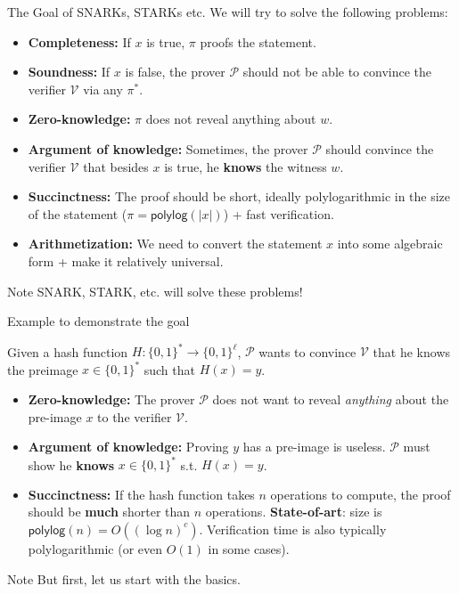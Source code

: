 \documentclass[xcolor={usenames,dvipsnames}]{beamer}
\begin{document}
    \begin{frame}{The Goal of SNARKs, STARKs etc.}
        We will try to solve the following problems:
        \begin{itemize}
            \item \textbf{Completeness:} If $x$ is true, $\pi$ proofs the statement.
            \item \textbf{Soundness:} If $x$ is false, the prover $\mathcal{P}$ should not be able to convince the verifier $\mathcal{V}$ via any $\pi^*$.
            \item \textbf{Zero-knowledge:} $\pi$ does not reveal anything about $w$.
            \item \textbf{Argument of knowledge:} Sometimes, the prover $\mathcal{P}$ should convince the verifier $\mathcal{V}$ that besides $x$ is true, he \textbf{knows} the witness $w$.
            \item \textbf{Succinctness:} The proof should be short, ideally polylogarithmic in the size of the statement ($\pi = \mathsf{polylog}(|x|)$) + fast verification.
            \item \textbf{Arithmetization:} We need to convert the statement $x$ into some algebraic form + make it relatively universal.
        \end{itemize}

        \begin{alertblock}{Note}
            SNARK, STARK, etc. will solve these problems!
        \end{alertblock}
    \end{frame}

    \begin{frame}{Example to demonstrate the goal}
        \begin{example}
            Given a hash function $H: \{0,1\}^* \to \{0,1\}^{\ell}$, $\mathcal{P}$ wants to convince $\mathcal{V}$ that he knows the preimage $x \in \{0,1\}^*$ such that $H(x) = y$.
            \begin{itemize}
                \item \textbf{Zero-knowledge:} The prover $\mathcal{P}$ does not want to reveal \textit{anything} about the pre-image $x$ to the verifier $\mathcal{V}$.
                \item \textbf{Argument of knowledge:} Proving $y$ has a pre-image is useless. $\mathcal{P}$ must show he \textbf{knows} $x \in \{0,1\}^*$ s.t. $H(x)=y$.
                \item \textbf{Succinctness:} If the hash function takes $n$ operations to compute, the proof should be \textbf{much} shorter than $n$ operations. \textbf{State-of-art}: size is $\mathsf{polylog}(n) = O((\log n)^c)$. Verification time is also typically polylogarithmic (or even $O(1)$ in some cases).
            \end{itemize}
        \end{example}

        \begin{block}{Note}
            But first, let us start with the basics.
        \end{block}
    \end{frame}
\end{document}

